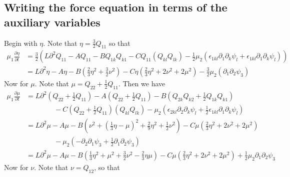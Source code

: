 \documentclass[reqno]{article}
\begin{document}
	\subsection{Writing the force equation in terms of the auxiliary variables} \label{sec:force-aux}
	Begin with $\eta$. Note that $\eta = \frac{3}{2}Q_{11}$ so that
	\begin{equation} \label{eq:etaeq}
	\begin{split}
		\mu_1 \frac{\partial \eta}{\partial t} 
		&= \frac{3}{2}\left( L\partial^2 Q_{11} 
		- A Q_{11} 
		- B Q_{1k}Q_{k1} 
		- C Q_{11}\left( Q_{kl}Q_{lk} \right) 
		- \frac{1}{2}\mu_2 \left( 
		\epsilon_{1kl}\partial_1\partial_k \psi_l + \epsilon_{1kl}\partial_1 \partial_k \psi_l 
		\right) 
		\right) \\
		&= L\partial^2 \eta 
		- A\eta 
		- B\left( \frac23 \eta^2 + \frac32 \nu^2 \right) 
		- C\eta\left( \frac{2}{3}\eta^2 + 2\nu^2 + 2\mu^2 \right) 
		- \frac{3}{2}\mu_2\left( \partial_1\partial_2 \psi_3 \right)
	\end{split}
	\end{equation}
	Now for $\mu$. Note that $\mu = Q_{22} + \frac{1}{2} Q_{11}$. Then we have
	\begin{equation} \label{eq:mueq}
	\begin{split}
		\mu_1 \frac{\partial \mu}{\partial t} &= L \partial^2 \left( Q_{22} + \frac{1}{2}Q_{11} \right) - A\left(Q_{22} + \frac{1}{2} Q_{11}\right) - B\left( Q_{2k}Q_{k2} + \frac{1}{2}Q_{1k}Q_{k1} \right) \\
		&\qquad\qquad - C\left( Q_{22} + \frac{1}{2} Q_{11}\right)\left( Q_{kl}Q_{lk} \right) - \mu_2\left( \epsilon_{2kl}\partial_2\partial_k \psi_l + \frac{1}{2}\epsilon_{1kl}\partial_1\partial_k\psi_l \right) \\
		&= L\partial^2\mu - A\mu - B\left( \nu^2 + \left( \frac{1}{3}\eta - \mu \right)^2 + \frac{2}{9}\eta^2 + \frac{1}{2}\nu^2 \right) - C\mu\left( \frac{2}{3}\eta^2 + 2\nu^2 + 2\mu^2 \right) \\
		&\qquad\qquad - \mu_2\left( -\partial_2\partial_1\psi_3 + \frac{1}{2}\partial_1\partial_2\psi_3 \right) \\
		&= L\partial^2\mu - A\mu - B\left( \frac{1}{3}\eta^2 + \mu^2 + \frac{3}{2}\nu^2 - \frac{2}{3}\eta\mu \right) - C\mu\left( \frac{2}{3}\eta^2 + 2\nu^2 + 2\mu^2 \right) + \frac{1}{2}\mu_2\partial_1\partial_2 \psi_3
	\end{split}
	\end{equation}
	Now for $\nu$. Note that $\nu = Q_{12}$, so that
\end{document}
